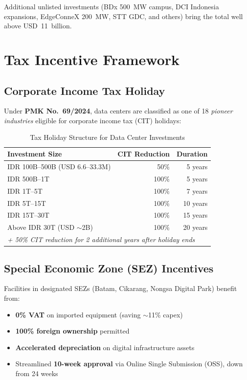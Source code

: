 \documentclass[11pt,a4paper]{article}
\begin{document}
\noindent Additional unlisted investments (BDx 500~MW campus, DCI Indonesia expansions, EdgeConneX 200~MW, STT GDC, and others) bring the total well above USD~11~billion.

\section{Tax Incentive Framework}

\subsection{Corporate Income Tax Holiday}

Under \textbf{PMK No.~69/2024}, data centers are classified as one of 18 \textit{pioneer industries} eligible for corporate income tax (CIT) holidays:

\begin{table}[H]
\centering
\caption{Tax Holiday Structure for Data Center Investments}
\begin{tabular}{p{5cm}rr}
\toprule
\textbf{Investment Size} & \textbf{CIT Reduction} & \textbf{Duration} \\
\midrule
IDR 100B--500B (USD 6.6--33.3M)  & 50\%  & 5 years \\
IDR 500B--1T                      & 100\% & 5 years \\
IDR 1T--5T                        & 100\% & 7 years \\
IDR 5T--15T                       & 100\% & 10 years \\
IDR 15T--30T                      & 100\% & 15 years \\
Above IDR 30T (USD $\sim$2B)      & 100\% & 20 years \\
\midrule
\multicolumn{3}{l}{\textit{+ 50\% CIT reduction for 2 additional years after holiday ends}} \\
\bottomrule
\end{tabular}
\end{table}

\subsection{Special Economic Zone (SEZ) Incentives}

Facilities in designated SEZs (Batam, Cikarang, Nongsa Digital Park) benefit from:
\begin{itemize}[leftmargin=*]
    \item \textbf{0\% VAT} on imported equipment (saving $\sim$11\% capex)
    \item \textbf{100\% foreign ownership} permitted
    \item \textbf{Accelerated depreciation} on digital infrastructure assets
    \item Streamlined \textbf{10-week approval} via Online Single Submission (OSS), down from 24 weeks
\end{itemize}
\end{document}
